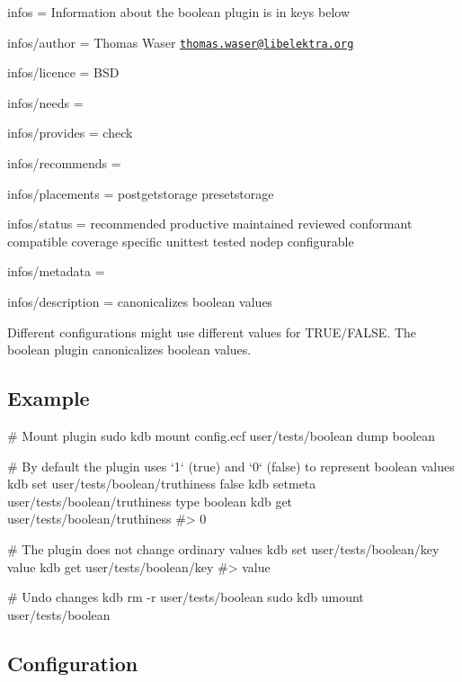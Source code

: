 
\begin{DoxyItemize}
\item infos = Information about the boolean plugin is in keys below
\item infos/author = Thomas Waser \href{mailto:thomas.waser@libelektra.org}{\tt thomas.\+waser@libelektra.\+org}
\item infos/licence = B\+SD
\item infos/needs =
\item infos/provides = check
\item infos/recommends =
\item infos/placements = postgetstorage presetstorage
\item infos/status = recommended productive maintained reviewed conformant compatible coverage specific unittest tested nodep configurable
\item infos/metadata =
\item infos/description = canonicalizes boolean values
\end{DoxyItemize}

Different configurations might use different values for {\ttfamily T\+R\+UE}/{\ttfamily F\+A\+L\+SE}. The {\ttfamily boolean} plugin canonicalizes boolean values.

\subsection*{Example}


\begin{DoxyCode}
# Mount plugin
sudo kdb mount config.ecf user/tests/boolean dump boolean

# By default the plugin uses `1` (true) and `0` (false) to represent boolean values
kdb set user/tests/boolean/truthiness false
kdb setmeta user/tests/boolean/truthiness type boolean
kdb get user/tests/boolean/truthiness
#> 0

# The plugin does not change ordinary values
kdb set user/tests/boolean/key value
kdb get user/tests/boolean/key
#> value

# Undo changes
kdb rm -r user/tests/boolean
sudo kdb umount user/tests/boolean
\end{DoxyCode}


\subsection*{Configuration}


